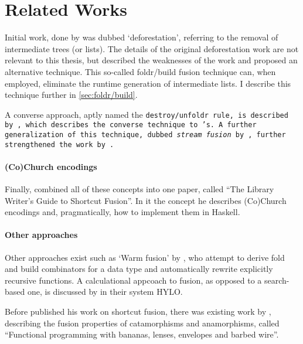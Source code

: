\section{Related Works}\label{sec:related}
Initial work, done by \cite{Wadler1984,Wadler1986,Wadler1990} was dubbed `deforestation', referring to the removal of intermediate trees (or lists).
The details of the original deforestation work are not relevant to this thesis, but \cite{Gill1993} described the weaknesses of the work and proposed an alternative technique.
This so-called foldr/build fusion technique can, when employed, eliminate the runtime generation of intermediate lists.
I describe this technique further in \autoref{sec:foldr/build}.

A converse approach, aptly named the \tt{destroy/unfoldr} rule, is described by \cite{Svenningsson2002}, which describes the converse technique to \cite{Gill1993}'s.
A further generalization of this technique, dubbed \textit{stream fusion} by \cite{Coutts2007}, further strengthened the work by \cite{Svenningsson2002}.

\paragraph{(Co)Church encodings}
Finally, \cite{Harper2011} combined all of these concepts into one paper, called ``The Library Writer's Guide to Shortcut Fusion''.
In it the concept he describes (Co)Church encodings and, pragmatically, how to implement them in Haskell.

\paragraph{Other approaches}
Other approaches exist such as `Warm fusion' by \cite{Launchbury1995}, who attempt to derive fold and build combinators for a data type and automatically rewrite explicitly recursive functions.
A calculational appcoach to fusion, as opposed to a search-based one, is discussed by \cite{Onoue1997} in their system HYLO.

Before \cite{Gill1993} published his work on shortcut fusion, there was existing work by \cite{Meijer1991}, describing the fusion properties of catamorphisms and anamorphisms, called ``Functional programming with bananas, lenses, envelopes and barbed wire''.